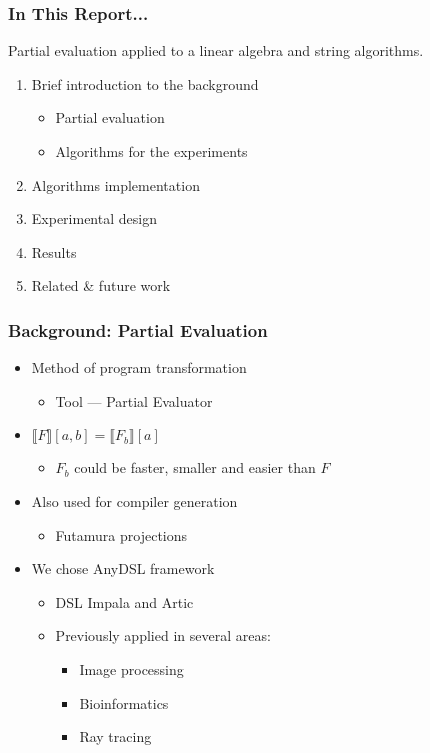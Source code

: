 \documentclass{beamer}
\begin{document}
\begin{frame}
	\frametitle{In This Report...}
	Partial evaluation applied to a linear algebra and string algorithms. \vfill	
	
	
	\begin{enumerate}
	\item Brief introduction to the background
	\begin{itemize}
		\item Partial evaluation
		\item Algorithms for the experiments
	\end{itemize}\vfill
	\item Algorithms implementation\vfill
	\item Experimental design\vfill
	\item Results\vfill
	\item Related \& future work
	\end{enumerate}
\end{frame}

\begin{frame}
	\transwipe[direction=90]
	\frametitle{Background: Partial Evaluation}
	\begin{itemize}
		\item Method of program transformation 	
		\begin{itemize}
			\item Tool --- Partial Evaluator
		\end{itemize}\vfill
	
		\item $\llbracket F \rrbracket [a, b] = \llbracket F_b \rrbracket [a]$ 	
		\begin{itemize}
			\item $F_b$ could be faster, smaller and easier than $F$
		\end{itemize}\vfill
		
		
		\item Also used for compiler generation
		\begin{itemize}
			\item Futamura projections
		\end{itemize} \vfill
	
		\item We chose AnyDSL framework	
		\begin{itemize}
			\item DSL Impala and Artic
			\item Previously applied in several areas:
			\begin{itemize}
				\item Image processing
				\item Bioinformatics
				\item Ray tracing
			\end{itemize}
		\end{itemize}
	\end{itemize}
\end{frame}
\end{document}
